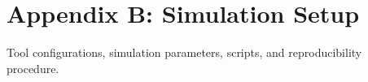 \chapter{Appendix B: Simulation Setup}
Tool configurations, simulation parameters, scripts, and reproducibility procedure.


